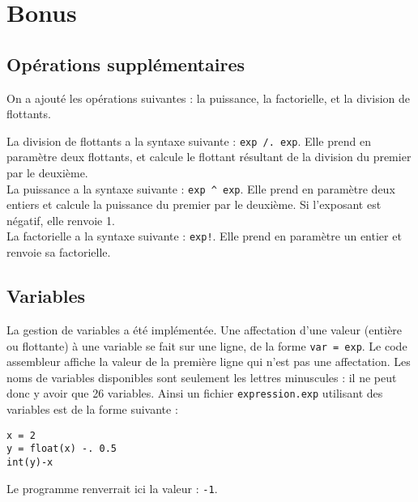 \documentclass[french]{article}
\begin{document}
\section{Bonus}

\subsection{Opérations supplémentaires}

On a ajouté les opérations suivantes : la puissance, la factorielle, et la division de flottants.

\vspace{0.2cm}

La division de flottants a la syntaxe suivante : \texttt{exp /. exp}. Elle prend en paramètre deux flottants, et calcule le flottant résultant de la division du premier par le deuxième. \\
La puissance a la syntaxe suivante : \texttt{exp \^{} exp}. Elle prend en paramètre deux entiers et calcule la puissance du premier par le deuxième. Si l'exposant est négatif, elle renvoie 1. \\
La factorielle a la syntaxe suivante : \texttt{exp!}. Elle prend en paramètre un entier et renvoie sa factorielle.

\subsection{Variables}

La gestion de variables a été implémentée. Une affectation d'une valeur (entière ou flottante) à une variable se fait sur une ligne, de la forme \texttt{var = exp}. Le code assembleur affiche la valeur de la première ligne qui n'est pas une affectation. Les noms de variables disponibles sont seulement les lettres minuscules : il ne peut donc y avoir que 26 variables. Ainsi un fichier \texttt{expression.exp} utilisant des variables est de la forme suivante :

\begin{leftbar}
\begin{verbatim}
x = 2
y = float(x) -. 0.5
int(y)-x
\end{verbatim}
\end{leftbar}

Le programme renverrait ici la valeur : \texttt{-1}.
\end{document}
